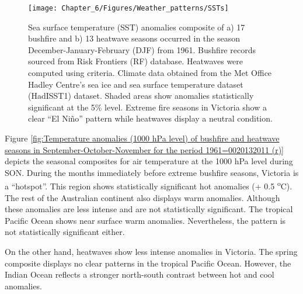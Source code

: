 \begin{figure}[h]
\noindent \begin{centering}
\texttt{[image: Chapter\_6/Figures/Weather\_patterns/SSTs]}
\par\end{centering}

\caption[Sea surface temperature (SST) anomalies composite of a) 17 bushfire
and b) 13 heatwave seasons occurred in the season December-January-February
(DJF) from 1961]{Sea surface temperature (SST) anomalies composite of a) 17 bushfire
and b) 13 heatwave seasons occurred in the season December-January-February
(DJF) from 1961. Bushfire records sourced from Risk
Frontiers (RF) database. Heatwaves were computed using \citet{Pezza2012}
criteria. Climate data obtained from the Met Office Hadley Centre\textquoteright s
sea ice and sea surface temperature dataset (HadISST1) dataset. Shaded
areas show anomalies statistically significant at the 5\% level. Extreme
fire seasons in Victoria show a clear ``El Ni\~no'' pattern while
heatwaves display a neutral condition. \label{fig:Sea surface temperature anomalies of bushfire and heatwave seasons in December-January-February for the period 1961=0020132011 (r)}}


\end{figure}


Figure \ref{fig:Temperature anomalies (1000 hPa level) of bushfire and heatwave seasons in September-October-November for the period 1961=0020132011 (r)}
depicts the seasonal composites for air temperature at the 1000 hPa
level during SON. During the months immediately before extreme bushfire
seasons, Victoria is a ``hotspot''. This region shows statistically
significant hot anomalies (+ 0.5 \textsuperscript{o}C). The rest
of the Australian continent also displays warm anomalies. Although
these anomalies are less intense and are not statistically significant.
The tropical Pacific Ocean shows near surface warm anomalies. Nevertheless,
the pattern is not statistically significant either.

On the other hand, heatwaves show less intense anomalies in Victoria.
The spring composite displays no clear patterns in the tropical Pacific
Ocean. However, the Indian Ocean reflects a stronger north-south contrast
between hot and cool anomalies.

